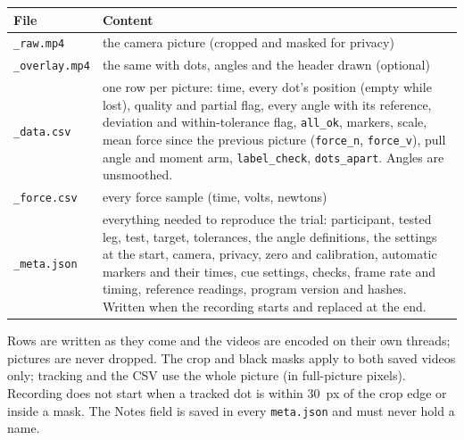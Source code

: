 \documentclass[a4paper,10pt]{article}
\newcommand{\code}[1]{\texttt{#1}}
\begin{document}
\medskip

\begin{tabularx}{\linewidth}{@{}lL@{}}
\toprule
File & Content \\
\midrule
\code{\_raw.mp4} & the camera picture (cropped and masked for privacy) \\
\code{\_overlay.mp4} & the same with dots, angles and the header drawn (optional) \\
\code{\_data.csv} & one row per picture: time, every dot's position (empty while lost), quality and partial flag, every angle with its
  reference, deviation and within-tolerance flag, \code{all\_ok}, markers, scale, mean force since the previous picture (\code{force\_n},
  \code{force\_v}), pull angle and moment arm, \code{label\_check}, \code{dots\_apart}. Angles are unsmoothed. \\
\code{\_force.csv} & every force sample (time, volts, newtons) \\
\code{\_meta.json} & everything needed to reproduce the trial: participant, tested leg, test, target, tolerances, the angle definitions,
  the settings at the start, camera, privacy, zero and calibration, automatic markers and their times, cue settings, checks, frame rate and
  timing, reference readings, program version and hashes. Written when the recording starts and replaced at the end. \\
\bottomrule
\end{tabularx}

\medskip\noindent Rows are written as they come and the videos are encoded on their own threads; pictures are never dropped. The crop
and black masks apply to both saved videos only; tracking and the CSV use the whole picture (in full-picture pixels). Recording does not
start when a tracked dot is within 30~px of the crop edge or inside a mask. The Notes field is saved in every \code{meta.json} and must never
hold a name.
\end{document}
